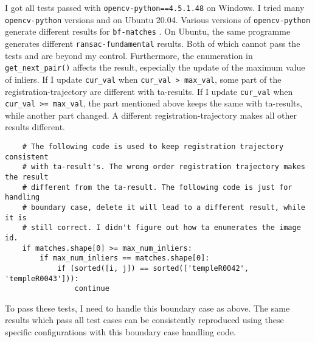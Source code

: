 I got all tests passed with \texttt{opencv-python==4.5.1.48} on Windows. I tried many \texttt{opencv-python} versions and on Ubuntu 20.04. Various versions of \texttt{opencv-python} generate different results for \texttt{bf-matches} . On Ubuntu, the same programme generates different \texttt{ransac-fundamental} results. Both of which cannot pass the tests and are beyond my control. Furthermore, the enumeration in \texttt{get\_next\_pair()} affects the result, especially the update of the maximum value of inliers. If I update \texttt{cur\_val} when \texttt{cur\_val > max\_val}, some part of the registration-trajectory are different with ta-results. If I update \texttt{cur\_val} when \texttt{cur\_val >= max\_val}, the part mentioned above keeps the same with ta-results, while another part changed. A different registration-trajectory makes all other results different. 

\begin{verbatim}
    # The following code is used to keep registration trajectory consistent 
    # with ta-result's. The wrong order registration trajectory makes the result 
    # different from the ta-result. The following code is just for handling 
    # boundary case, delete it will lead to a different result, while it is 
    # still correct. I didn't figure out how ta enumerates the image id.
    if matches.shape[0] >= max_num_inliers:
        if max_num_inliers == matches.shape[0]:
            if (sorted([i, j]) == sorted(['templeR0042', 'templeR0043'])):
                continue
\end{verbatim}

To pass these tests, I need to handle this boundary case as above. The same results which pass all test cases can be consistently reproduced using these specific configurations with this boundary case handling code.




